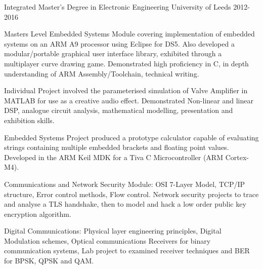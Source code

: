 

\begin{cventries}

  \cventry
    {Integrated Master's Degree in Electronic Engineering} %
    {University of Leeds} %
    {} %
    {2012-2016} %
    {
      \begin{cvitems}
          \item{Masters Level Embedded Systems Module covering implementation of embedded systems on an ARM A9 processor using Eclipse for DS5. Also developed a modular/portable graphical user interface library, exhibited through a multiplayer curve drawing game. Demonstrated high proficiency in C, in depth understanding of ARM Assembly/Toolchain, technical writing.}
          \item{Individual Project involved the parameterised simulation of Valve Amplifier in MATLAB for use as a creative audio effect. Demonstrated Non-linear and linear DSP, analogue circuit analysis, mathematical modelling, presentation and exhibition skills.}
          \item{Embedded Systems Project produced a prototype calculator capable of evaluating strings containing multiple embedded brackets and floating point values. Developed in the ARM Keil MDK for a Tiva C Microcontroller (ARM Cortex-M4).}
          \item{Communications and Network Security Module: OSI 7-Layer Model, TCP/IP structure, Error control methods, Flow control. Network security projects to trace and analyse a TLS handshake, then to model and hack a low order public key encryption algorithm.}
          \item{Digital Communications: Physical layer engineering principles, Digital Modulation schemes, Optical communications Receivers for binary communication systems, Lab project to examined receiver techniques and BER for BPSK, QPSK and QAM.}

\end{cvitems}}
\end{cventries}
